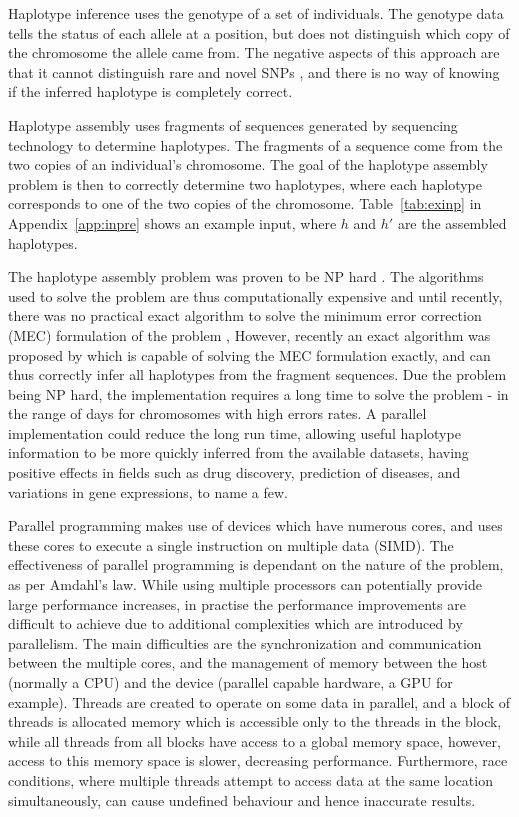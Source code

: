 \documentclass[10pt,twocolumn]{article}
\begin{document}
Haplotype inference uses the genotype of a set of individuals. The genotype data tells the status of each
allele at a position, but does not distinguish which copy of the chromosome the allele came from.
The negative aspects of this approach are that it cannot distinguish rare and novel SNPs \cite{he:2010}, 
and there is no way of knowing if the inferred haplotype is completely correct. 

Haplotype assembly uses fragments of sequences generated by sequencing technology to determine
haplotypes. The fragments of a sequence come from the two copies of an individual's chromosome. The goal of the
haplotype assembly problem is then to correctly determine two haplotypes, where each haplotype corresponds to
one of the two copies of the chromosome. Table~\ref{tab:exinp} in Appendix~\ref{app:inpre} shows an example
input, where $h$ and $h'$ are the assembled haplotypes. 

The haplotype assembly problem was proven to be NP hard \cite{lippert:2002}. The algorithms used to solve the
problem are thus computationally expensive and until recently, there was no practical exact algorithm to solve 
the minimum error correction (MEC) formulation of the problem \cite{bonizzoni:2003},
However, recently an exact algorithm was proposed by \cite{chen:2013} which is capable of solving the MEC 
formulation exactly, and can thus correctly infer all haplotypes from the fragment sequences. Due the problem
being NP hard, the implementation requires a long time to solve the problem - in the range of days for chromosomes with high
errors rates. A parallel implementation could reduce the long run time, 
allowing useful haplotype information to be more quickly inferred from the available datasets, having
positive effects in fields such as drug discovery, prediction of diseases, and variations in gene
expressions, to name a few. 

Parallel programming makes use of devices which have numerous cores, and uses these cores to execute a single
instruction on multiple data (SIMD). The effectiveness of parallel programming is dependant on the nature of 
the problem, as per Amdahl's law. While using multiple processors can potentially provide large performance 
increases, in practise the performance improvements are difficult to achieve due to additional complexities 
which are introduced by parallelism. The main difficulties are the synchronization and communication between 
the multiple cores, and the management of memory between the host (normally a CPU) and the device (parallel
capable hardware, a GPU for example). Threads are created to operate on some data in parallel, and a block of
threads is allocated memory which is accessible only to the threads in the block, while all threads from all
blocks have access  to a global memory space, however, access to this  memory space is slower, decreasing 
performance. Furthermore, race conditions, where multiple threads attempt to access data at the same location 
simultaneously, can cause undefined behaviour and hence inaccurate results.
\end{document}
